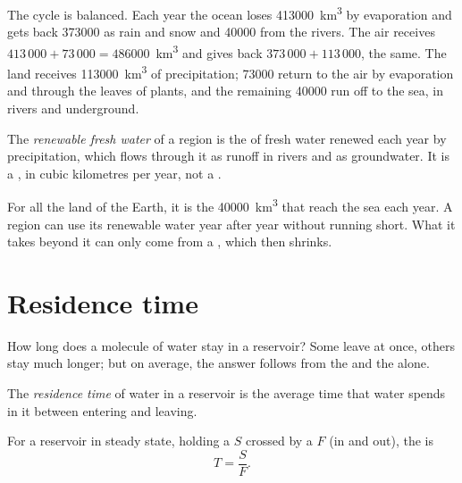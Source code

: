 The cycle is balanced. Each year the ocean loses \num{413000}~\unit{km^3} by
evaporation and gets back \num{373000} as rain and snow and \num{40000} from
the rivers. The air receives $413\,000 + 73\,000 = \num{486000}$~\unit{km^3}
and gives back $373\,000 + 113\,000$, the same. The land receives
\num{113000}~\unit{km^3} of precipitation; \num{73000} return to the air by
evaporation and through the leaves of plants, and the remaining \num{40000}
run off to the sea, in rivers and underground.

\begin{definition}\label{def:g10:freshwater-resources:renewable}
The \emph{renewable fresh water} of a region is
the  of fresh water renewed each year by precipitation, which flows
through it as runoff in rivers and as groundwater. It is a , in cubic
kilometres per year, not a .
\end{definition}

For all the land of the Earth, it is the \num{40000}~\unit{km^3} that reach
the sea each year. A region can use its renewable water year after year
without running short. What it takes beyond it can only come from a ,
which then shrinks.

\section{Residence time}

How long does a molecule of water stay in a reservoir? Some leave at once,
others stay much longer; but on average, the answer follows from the  and
the  alone.

\begin{definition}\label{def:g10:freshwater-resources:residence-time}
The \emph{residence time} of water in a reservoir is the
average time that water spends in it between entering and leaving.
\end{definition}

\begin{proposition}\label{prop:g10:freshwater-resources:residence}
For a reservoir in steady state, holding a  $S$ crossed by a  $F$
(in and out), the  is
\[
T = \frac{S}{F}.
\]
\end{proposition}

